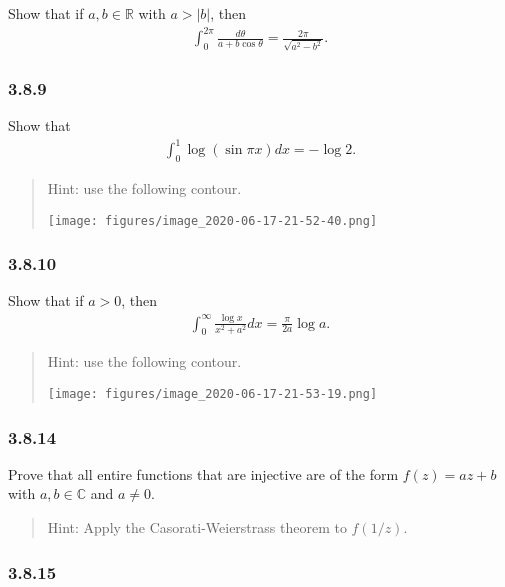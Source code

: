 Show that if \(a,b\in {\mathbb{R}}\) with
\(a > {\left\lvert {b} \right\rvert}\), then
\begin{align*}
\int_{0}^{2 \pi} \frac{d \theta}{a+b \cos \theta}=\frac{2 \pi}{\sqrt{a^{2}-b^{2}}}
.\end{align*}

\hypertarget{section-62}{%
\subsubsection{3.8.9}\label{section-62}}

Show that
\begin{align*}
\int_{0}^{1} \log (\sin \pi x) d x=-\log 2
.\end{align*}

\begin{quote}
Hint: use the following contour.

\texttt{[image: figures/image\_2020-06-17-21-52-40.png]}
\end{quote}

\hypertarget{section-63}{%
\subsubsection{3.8.10}\label{section-63}}

Show that if \(a>0\), then
\begin{align*}
\int_{0}^{\infty} \frac{\log x}{x^{2}+a^{2}} d x=\frac{\pi}{2 a} \log a
.\end{align*}

\begin{quote}
Hint: use the following contour.

\texttt{[image: figures/image\_2020-06-17-21-53-19.png]}
\end{quote}

\hypertarget{section-64}{%
\subsubsection{3.8.14}\label{section-64}}

Prove that all entire functions that are injective are of the form
\(f(z) = az + b\) with \(a,b\in {\mathbb{C}}\) and \(a\neq 0\).

\begin{quote}
Hint: Apply the Casorati-Weierstrass theorem to \(f(1/z)\).
\end{quote}

\hypertarget{section-65}{%
\subsubsection{3.8.15}\label{section-65}}


